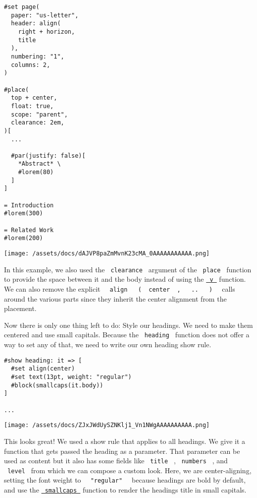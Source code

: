\begin{verbatim}
#set page(
  paper: "us-letter",
  header: align(
    right + horizon,
    title
  ),
  numbering: "1",
  columns: 2,
)

#place(
  top + center,
  float: true,
  scope: "parent",
  clearance: 2em,
)[
  ...

  #par(justify: false)[
    *Abstract* \
    #lorem(80)
  ]
]

= Introduction
#lorem(300)

= Related Work
#lorem(200)
\end{verbatim}

\texttt{[image: /assets/docs/dAJVP8paZmMvnK23cMA\_0AAAAAAAAAAA.png]}

In this example, we also used the \texttt{\ clearance\ } argument of the
\texttt{\ place\ } function to provide the space between it and the body
instead of using the \href{/docs/reference/layout/v/}{\texttt{\ v\ }}
function. We can also remove the explicit
\texttt{\ }{\texttt{\ align\ }}\texttt{\ }{\texttt{\ (\ }}\texttt{\ center\ }{\texttt{\ ,\ }}\texttt{\ }{\texttt{\ ..\ }}\texttt{\ }{\texttt{\ )\ }}\texttt{\ }
calls around the various parts since they inherit the center alignment
from the placement.

Now there is only one thing left to do: Style our headings. We need to
make them centered and use small capitals. Because the
\texttt{\ heading\ } function does not offer a way to set any of that,
we need to write our own heading show rule.

\begin{verbatim}
#show heading: it => [
  #set align(center)
  #set text(13pt, weight: "regular")
  #block(smallcaps(it.body))
]

...
\end{verbatim}

\texttt{[image: /assets/docs/ZJxJWdUySZNKlj1\_Vn1NWgAAAAAAAAAA.png]}

This looks great! We used a show rule that applies to all headings. We
give it a function that gets passed the heading as a parameter. That
parameter can be used as content but it also has some fields like
\texttt{\ title\ } , \texttt{\ numbers\ } , and \texttt{\ level\ } from
which we can compose a custom look. Here, we are center-aligning,
setting the font weight to
\texttt{\ }{\texttt{\ "regular"\ }}\texttt{\ } because headings are bold
by default, and use the
\href{/docs/reference/text/smallcaps/}{\texttt{\ smallcaps\ }} function
to render the heading\textquotesingle s title in small capitals.

